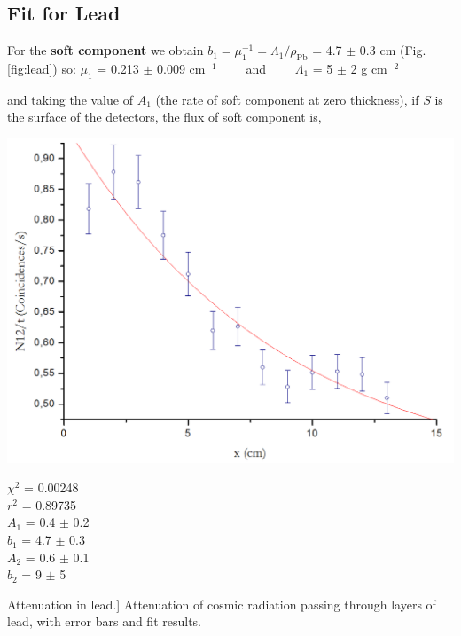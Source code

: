 \subsection{Fit for Lead}

For the \textbf{soft component} we obtain $b_1 = \mu_1^{-1} = \Lambda_1 / \rho_\text{Pb}$ = 4.7 $\pm$  0.3 cm (Fig. \ref{fig:lead}) so:\vspace{-1ex}
\bc $\mu_1$ = 0.213 $\pm$ 0.009 cm$^{-1} \qquad$ and $\qquad \Lambda_1$ = 5 $\pm$ 2 g cm$^{-2}$\ec


and taking the value of $A_1$ (the rate of soft component at zero thickness), if $S$ is the surface of the detectors, the flux of soft component is,

	\bfi[H]
		\begin{minipage}{.8\textwidth}
			\bc\includegraphics[width=\textwidth]{img/atenuationPb.png}\ec
		\end{minipage}\begin{minipage}{.2\textwidth}
			$\chi^2$ = 0.00248\\
			$r^2$ = 0.89735\\

			$A_1$ = 0.4 $\pm$ 0.2\\
			$b_1$ = 4.7 $\pm$ 0.3\\

			$A_2$ = 0.6 $\pm$ 0.1\\
			$b_2$ = 9 $\pm$ 5\\
		\end{minipage}
		\caption
			[Attenuation in lead.]
			{Attenuation of cosmic radiation passing through layers of lead, with error bars and fit results.}\label{fig:lead}
	\efi

